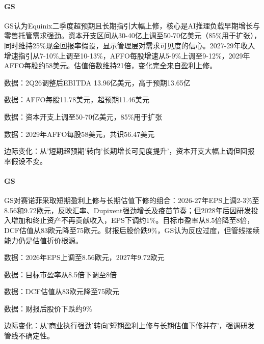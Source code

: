\documentclass[11pt]{ctexart}
\begin{document}
\paragraph{GS} GS认为Equinix二季度超预期且长期指引大幅上修，核心是AI推理负载早期增长与零售托管需求强劲。资本开支区间从30-40亿上调至50-70亿美元（85\%用于扩张），同时维持25\%现金回报率假设，显示管理层对需求可见度的信心。2027-29年收入增速指引从7-10\%上调至10-13\%，AFFO每股增速从5-9\%上调至9-12\%，2029年AFFO每股约58美元。估值倍数维持21倍，变化完全来自盈利上修。
{\small\color{refgray}数据：2Q26调整后EBITDA 13.96亿美元，高于预期13.65亿\par}
{\small\color{refgray}数据：AFFO每股11.78美元，超预期11.46美元\par}
{\small\color{refgray}数据：资本开支上调至50-70亿美元，85\%用于扩张\par}
{\small\color{refgray}数据：2029年AFFO每股58美元，共识56.47美元\par}
{\small\color{refgray}边际变化：从'短期超预期'转向'长期增长可见度提升'，资本开支大幅上调但回报率假设不变。\par}
\paragraph{GS} GS对赛诺菲采取短期盈利上修与长期估值下修的组合：2026-27年EPS上调2-3\%至8.56和9.72欧元，反映汇率、Dupixent强劲增长及疫苗节奏；但2028年后因研发投入增加和终止资产不再贡献收入，EPS下调约1\%。目标市盈率从8.5倍降至8倍，DCF估值从83欧元降至75欧元。财报后股价跌9\%，GS认为反应过度，但管线接续能力仍是估值折价根源。
{\small\color{refgray}数据：2026年EPS上调至8.56欧元，2027年9.72欧元\par}
{\small\color{refgray}数据：目标市盈率从8.5倍下调至8倍\par}
{\small\color{refgray}数据：DCF估值从83欧元降至75欧元\par}
{\small\color{refgray}数据：财报后股价下跌约9\%\par}
{\small\color{refgray}边际变化：从'商业执行强劲'转向'短期盈利上修与长期估值下修并存'，强调研发管线不确定性。\par}
\end{document}

